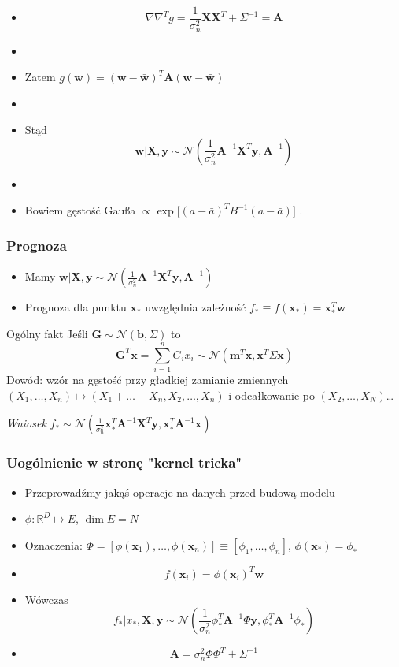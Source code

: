 \documentclass[draft, xetex]{beamer}
\newcommand{\xxx}{\mathbf{x}}
\newcommand{\www}{\mathbf{w}}
\newcommand{\yyy}{\mathbf{y}}
\newcommand{\X}{\mathbf{X}}
\newcommand{\A}{\mathbf{A}}
\begin{document}
\begin{frame}
	\begin{itemize}
		\item $$\nabla \nabla^T g = \frac{1}{\sigma_n^2} \X \X^T + \Sigma^{-1} = \A $$
		\item 
		\item Zatem $g(\www) = (\www - \bar{\www})^T \A (\www - \bar{\www}) $
		\item 
		\item Stąd $$ \www | \X, \yyy \sim \mathcal{N}(\frac{1}{\sigma^2_n} \A^{-1} \X^T \yyy, \A^{-1})$$
		\item
		\item Bowiem gęstość Gau\ss a  $\propto \exp \Big[(a-\bar{a})^T B^{-1} (a - \bar{a}) \Big]$ .
	\end{itemize}
\end{frame}

\begin{frame}
	\frametitle{Prognoza}
	
	\begin{itemize}
		\item Mamy $\www | \X, \yyy \sim \mathcal{N}(\frac{1}{\sigma^2_n} \A^{-1} \X^T \yyy, \A^{-1})$ 
		\item Prognoza dla punktu $\xxx_*$ uwzględnia zależność $f_* \equiv f(\xxx_*) = \xxx_*^T \www$
	\end{itemize}
	
	\begin{block}{Ogólny fakt}
		Jeśli $\mathbf{G} \sim \mathcal{N}(\mathbf{b}, \Sigma )$ to 	
		$$ \mathbf{G}^T \mathbf{x} =  \sum_{i=1}^n G_i x_i \sim \mathcal{N}( \mathbf{m}^T \xxx, \xxx^T \Sigma \xxx) $$
		Dowód: wzór na gęstość przy gładkiej zamianie zmiennych $(X_1, \dots, X_n) \mapsto (X_1 + \dots + X_n, X_2, \dots, X_n)$ i odcałkowanie po $(X_2, \dots, X_N)$\dots
	\end{block}
	\begin{center}
		\emph{Wniosek} $f_{*} \sim \mathcal{N}(\frac{1}{\sigma^2_n} \xxx_*^T \A^{-1} \X^T \yyy, \xxx_*^T \A^{-1} \xxx)$	
	\end{center}
\end{frame}


\begin{frame}
	\frametitle{Uogólnienie w stronę "kernel tricka"}
	
	\begin{itemize}
		\item Przeprowadźmy jakąś operacje na danych przed budową modelu
		\item $\phi: \mathbb{R}^D \mapsto E$, $\dim E = N$
		\item Oznaczenia: $\Phi = [\phi(\xxx_1), \dots, \phi(\xxx_n)] \equiv [ \phi_1, \dots, \phi_n ]$, $\phi(\xxx_*) = \phi_*$
		\item $$f(\xxx_i) = \phi(\xxx_i)^T \www$$
		\item Wówczas $$f_* | x_*, \X, \yyy \sim \mathcal{N}(\frac{1}{\sigma_n^2} \phi_*^T \A^{-1} \Phi \yyy, \phi_*^T \A^{-1} \phi_* )$$
		\item $$\A = \sigma^2_n \Phi \Phi^T + \Sigma^{-1}$$
	\end{itemize}
	
\end{frame}
\end{document}
